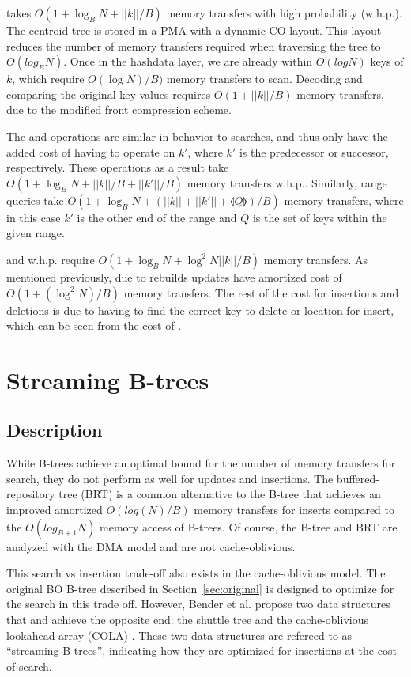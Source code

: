 \documentclass{style}
\begin{document}
\Search{} takes $O(1+\log_{B}N+||k||/B)$ memory transfers with high
probability (w.h.p.).  The centroid tree is stored in a PMA with a dynamic CO layout. This layout reduces the number of memory transfers required when traversing the tree to $O(log_{B}N)$.  Once in the hashdata layer, we are already within $O(logN)$ keys of $k$, which require $O(\log{}N)/B)$ memory transfers to scan. Decoding and comparing the original key values requires $O(1+||k||/B)$ memory transfers, due to the modified front compression scheme.

The \Pred{} and \Succ{} operations are similar in behavior to searches, and thus only have the added cost of having to operate on $k'$, where $k'$ is the predecessor or successor, respectively. These operations as a result take $O(1+\log_{B}N+||k||/B+||k'||/B)$ memory transfers w.h.p.. Similarly, range queries take
$O(1+\log_{B}N+(||k||+||k'||+\llangle{}Q\rrangle{})/B)$ memory transfers,
where in this case $k'$ is the other end of the range and $Q$ is the set of
keys within the given range.

\Insertkonly{} and \Delete{} w.h.p. require $O(1+\log_{B}N+\log^{2}N||k||/B)$
memory transfers. As mentioned previously, due to rebuilds updates have
amortized cost of $O(1+(\log^{2}N)/B)$ memory transfers. The rest of the cost
for insertions and deletions is due to having to find the correct key to
delete or location for insert, which can be seen from the cost of \Search{}.

\section{Streaming B-trees}

\subsection{Description}

While B-trees achieve an optimal bound for the number of memory transfers for
search, they do not perform as well for updates and insertions. The
buffered-repository tree (BRT) is a common alternative to the B-tree that
achieves an improved amortized $O(log(N)/B)$ memory transfers for inserts
compared to the $O(log_{B+1}N)$ memory access of B-trees. Of course, the
B-tree and BRT are analyzed with the DMA model and are not cache-oblivious.

This search vs insertion trade-off also exists in the cache-oblivious model.
The original BO B-tree described in Section~\ref{sec:original} is designed to
optimize for the search in this trade off. However, Bender et al. propose two
data structures that and achieve the opposite end: the shuttle tree and the
cache-oblivious lookahead array (COLA) \cite{BenderFaFi07}. These two data
structures are refereed to as ``streaming B-trees'', indicating how they are
optimized for insertions at the cost of search.
\end{document}

